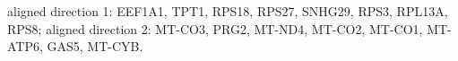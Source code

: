 aligned direction 1: EEF1A1, TPT1, RPS18, RPS27, SNHG29, RPS3, RPL13A, RPS8; aligned direction 2: MT-CO3, PRG2, MT-ND4, MT-CO2, MT-CO1, MT-ATP6, GAS5, MT-CYB.